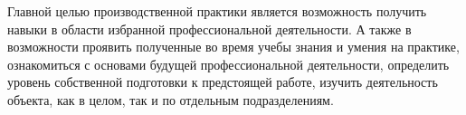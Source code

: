 Главной целью производственной практики является возможность получить навыки в области избранной 
профессиональной деятельности. А также в возможности проявить полученные во время учебы знания и 
умения на практике, ознакомиться с основами будущей профессиональной деятельности, определить уровень 
собственной подготовки к предстоящей работе, изучить деятельность объекта, как в целом, так и по 
отдельным подразделениям.
